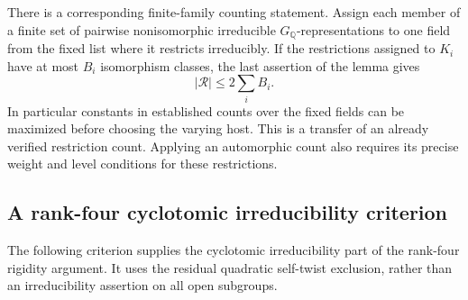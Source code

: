 There is a corresponding finite-family counting statement.
Assign each member of a finite set of pairwise nonisomorphic
irreducible \(G_{\mathbb Q}\)-representations to one field from
the fixed list where it restricts irreducibly.
If the restrictions assigned to \(K_i\) have at most \(B_i\)
isomorphism classes, the last assertion of the lemma gives
\[
                         |\mathcal R|\leq2\sum_i B_i.
\]
In particular constants in established counts over the fixed
fields can be maximized before choosing the varying host.
This is a transfer of an already verified restriction count.
Applying an automorphic count also requires its precise
weight and level conditions for these restrictions.

\subsection{A rank-four cyclotomic irreducibility criterion}
\label{sec:sr-rank-four-cyclotomic}

The following criterion supplies the cyclotomic irreducibility part of
the rank-four rigidity argument. It uses the residual quadratic
self-twist exclusion, rather than an irreducibility assertion on all
open subgroups.

